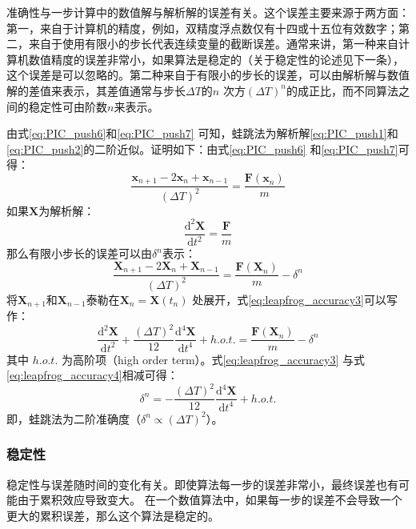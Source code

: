 {      准确性与一步计算中的数值解与解析解的误差有关。这个误差主要来源于两方面：第一，来自于计算机的精度，例如，双精度浮点数仅有十四或十五位有效数字；第二，来自于使用有限小的步长代表连续变量的截断误差。通常来讲，第一种来自计算机数值精度的误差非常小，如果算法是稳定的（关于稳定性的论述见下一条），这个误差是可以忽略的。第二种来自于有限小的步长的误差，可以由解析解与数值解的差值来表示，其差值通常与步长$\Delta T$的$n$ 次方$(\Delta T)^n$的成正比，而不同算法之间的稳定性可由阶数$n$来表示。

      由式\ref{eq:PIC_push6}和\ref{eq:PIC_push7} 可知，蛙跳法为解析解\ref{eq:PIC_push1}和\ref{eq:PIC_push2}的二阶近似。证明如下：由式\ref{eq:PIC_push6} 和\ref{eq:PIC_push7}可得：
      \begin{equation}
         \label{eq:leapfrog_accuracy}
         \frac{\mathbf{x}_{n+1}-2\mathbf{x}_{n}+\mathbf{x}_{n-1}}{(\Delta T)^2} = \frac{\mathbf{F}(\mathbf{x}_n)}{m}
      \end{equation}
      如果$\mathbf{X}$为解析解：
      \begin{equation}
         \label{eq:leapfrog_accuracy2}
         \frac{\mathrm{d}^2 \mathbf{X}}{\mathrm{d} t^2} = \frac{\mathbf{F}}{m}
      \end{equation}
      那么有限小步长的误差可以由${\delta}^n$表示：
      \begin{equation}
         \label{eq:leapfrog_accuracy3}
         \frac{\mathbf{X}_{n+1}-2\mathbf{X}_{n}+\mathbf{X}_{n-1}}{(\Delta T)^2} = \frac{\mathbf{F}(\mathbf{X}_n)}{m} - {\delta}^n
      \end{equation}
      将$\mathbf{X}_{n+1}$和$\mathbf{X}_{n-1}$泰勒在$\mathbf{X}_{n}=\mathbf{X}(t_n)$ 处展开，式\ref{eq:leapfrog_accuracy3}可以写作：
      \begin{equation}
         \label{eq:leapfrog_accuracy4}
         \frac{\mathrm{d}^2 \mathbf{X}}{\mathrm{d} t^2} + \frac{(\Delta T)^2}{12} \frac{\mathrm{d}^4 \mathbf{X}}{\mathrm{d} t^4} + h.o.t. =  \frac{\mathbf{F}(\mathbf{X}_n)}{m} - {\delta}^n
      \end{equation}
      其中 $h.o.t.$ 为高阶项（high order term）。式\ref{eq:leapfrog_accuracy3} 与式\ref{eq:leapfrog_accuracy4}相减可得：
      \begin{equation}
         \label{eq:leapfrog_accuracy5}
         {\delta}^n = -\frac{(\Delta T)^2}{12} \frac{\mathrm{d}^4 \mathbf{X}}{\mathrm{d} t^4} + h.o.t.
      \end{equation}
      即，蛙跳法为二阶准确度（${\delta}^n \propto (\Delta T)^2$）。
\subsubsection{稳定性}
稳定性与误差随时间的变化有关。即使算法每一步的误差非常小，最终误差也有可能由于累积效应导致变大。
在一个数值算法中，如果每一步的误差不会导致一个更大的累积误差，那么这个算法是稳定的。

}
